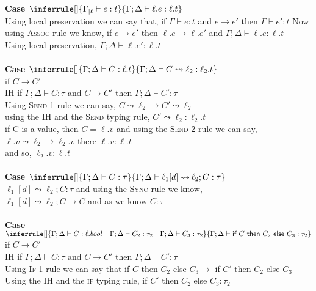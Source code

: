\documentclass{article}
\begin{document}
\textbf{Case $\inferrule []
{ \Gamma_{|\ell} \vdash e : t }
{ \Gamma ; \Delta \vdash \ell.e : \ell.t }$}       \\ 
Using local preservation we can say that, if $\Gamma \vdash e : t$ and  $e \to e'$ then $\Gamma \vdash e' : t$
Now using \textsc{Assoc} rule we know, if $e \to e'$ then $\ell.e \to \ell.e'$ and $\Gamma; \Delta \vdash \ell.e : \ell.t$  \\
Using local preservation, $\Gamma;\Delta \vdash \ell.e' : \ell.t$
\\ \\
\textbf{Case $\inferrule []
{ \Gamma ; \Delta \vdash C : \ell.t}
{ \Gamma;\Delta \vdash C \leadsto \ell_2 : \ell_2.t}$ } \\
if $C \to C'$ \\
IH if $\Gamma;\Delta \vdash C : \tau$ and  $C \to C'$ then $\Gamma; \Delta \vdash C' : \tau$ \\
Using \textsc{Send 1} rule we can say, $ C \leadsto \ell_2 \to  C' \leadsto \ell_2 $\\
using the IH and the \textsc{Send} typing rule, $C' \leadsto \ell_2 : \ell_2.t$\\
if C is a value, then $C = \ell.v$ and using the \textsc{Send 2} rule we can say, \\
$\ell.v \leadsto \ell_2 \to \ell_2.v $ there $\ell.v : \ell.t$ \\
and so, $\ell_2.v : \ell.t$
\\\\
\textbf{Case $\inferrule []
{ \Gamma;\Delta \vdash C : \tau}
{ \Gamma;\Delta \vdash \ell_1[d] \leadsto \ell_2 ; C : \tau}$ } \\
$\ell_1[d] \leadsto \ell_2 ; C : \tau$ and using the \textsc{Sync} rule we know, \\
$\ell_1[d] \leadsto \ell_2 ; C \to C$ and as we know $C : \tau$
\\\\
\textbf{Case $\inferrule []
{ \Gamma;\Delta \vdash C : \ell.bool \quad \Gamma;\Delta\vdash C_2 : \tau_2 \quad \Gamma;\Delta \vdash C_3 : \tau_2 }
{ \Gamma;\Delta \vdash \textsf{if } C \textsf{ then } C_2 \textsf{ else } C_3: \tau_2  }$ } \\
if $C \to C'$ \\
IH if $\Gamma;\Delta \vdash C : \tau$ and  $C \to C'$ then $\Gamma; \Delta \vdash C' : \tau$ \\
Using \textsc{If 1} rule we can say that if $C$ then $C_2$ else $C_3 \to$ if $C'$ then $C_2$ else $C_3$ \\
Using the IH and the \textsc{if} typing rule, if $C'$ then $C_2$ else $C_3 : \tau_2$ \\
\end{document}
